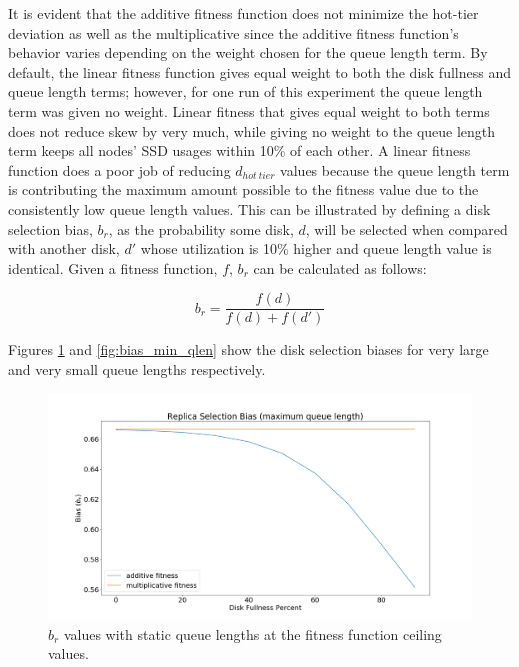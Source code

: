 \documentclass[12pt]{article}
\begin{document}
    \FloatBarrier

    It is evident that the additive fitness function does not minimize the
    hot-tier deviation as well as the multiplicative since the additive fitness
    function's behavior varies depending on the weight chosen for the queue
    length term. By default, the linear fitness function
    gives equal weight to both the disk fullness and queue length terms;
    however, for one run of this experiment the queue length term was given no
    weight. Linear fitness that gives equal weight to both terms does not
    reduce skew by very much, while giving no weight to the queue length term
    keeps all nodes' SSD usages within 10\% of each other. A linear fitness
    function does a poor job of reducing $d_{hot\ tier}$ values because the
    queue length term is contributing the maximum amount possible to the
    fitness value due to the consistently low queue length values. This can be
    illustrated by defining a disk selection bias, $b_r$, as the probability
    some disk, $d$, will be selected when compared with another disk, $d'$
    whose utilization is 10\% higher and queue length value is identical. Given
    a fitness function, $f$, $b_r$ can be calculated as follows:

    \begin{equation}
      b_r = \frac{f(d)}{f(d) + f(d')}
    \end{equation}

    Figures \ref{fig:bias_max_qlen} and \ref{fig:bias_min_qlen} show the disk
    selection biases for very large and very small queue lengths respectively.

    \begin{figure}[htbp]
      \centering
      \includegraphics[scale=0.32]{images/replica_selection_bias_max_qlen.png} 
      \caption{$b_r$ values with static queue lengths at the fitness
               function ceiling values.}
      \label{fig:bias_max_qlen}
    \end{figure}
\end{document}
